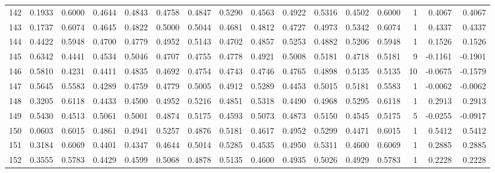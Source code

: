 \begin{tabular}{lrrrrrrrrrrrrrrr}
142 &      0.1933 &  0.6000 &  0.4644 &  0.4843 &  0.4758 &  0.4847 &  0.5290 &  0.4563 &  0.4922 &  0.5316 &   0.4502 &     0.6000 &      1 &                    0.4067 &                     0.4067 \\
143 &      0.1737 &  0.6074 &  0.4645 &  0.4822 &  0.5000 &  0.5044 &  0.4681 &  0.4812 &  0.4727 &  0.4973 &   0.5342 &     0.6074 &      1 &                    0.4337 &                     0.4337 \\
144 &      0.4422 &  0.5948 &  0.4700 &  0.4779 &  0.4952 &  0.5143 &  0.4702 &  0.4857 &  0.5253 &  0.4882 &   0.5206 &     0.5948 &      1 &                    0.1526 &                     0.1526 \\
145 &      0.6342 &  0.4441 &  0.4534 &  0.5046 &  0.4707 &  0.4755 &  0.4778 &  0.4921 &  0.5008 &  0.5181 &   0.4718 &     0.5181 &      9 &                   -0.1161 &                    -0.1901 \\
146 &      0.5810 &  0.4231 &  0.4411 &  0.4835 &  0.4692 &  0.4754 &  0.4743 &  0.4746 &  0.4765 &  0.4898 &   0.5135 &     0.5135 &     10 &                   -0.0675 &                    -0.1579 \\
147 &      0.5645 &  0.5583 &  0.4289 &  0.4759 &  0.4779 &  0.5005 &  0.4912 &  0.5289 &  0.4453 &  0.5015 &   0.5181 &     0.5583 &      1 &                   -0.0062 &                    -0.0062 \\
148 &      0.3205 &  0.6118 &  0.4433 &  0.4500 &  0.4952 &  0.5216 &  0.4851 &  0.5318 &  0.4490 &  0.4968 &   0.5295 &     0.6118 &      1 &                    0.2913 &                     0.2913 \\
149 &      0.5430 &  0.4513 &  0.5061 &  0.5001 &  0.4874 &  0.5175 &  0.4593 &  0.5073 &  0.4873 &  0.5150 &   0.4545 &     0.5175 &      5 &                   -0.0255 &                    -0.0917 \\
150 &      0.0603 &  0.6015 &  0.4861 &  0.4941 &  0.5257 &  0.4876 &  0.5181 &  0.4617 &  0.4952 &  0.5299 &   0.4471 &     0.6015 &      1 &                    0.5412 &                     0.5412 \\
151 &      0.3184 &  0.6069 &  0.4401 &  0.4347 &  0.4644 &  0.5014 &  0.5285 &  0.4535 &  0.4950 &  0.5311 &   0.4600 &     0.6069 &      1 &                    0.2885 &                     0.2885 \\
152 &      0.3555 &  0.5783 &  0.4429 &  0.4599 &  0.5068 &  0.4878 &  0.5135 &  0.4600 &  0.4935 &  0.5026 &   0.4929 &     0.5783 &      1 &                    0.2228 &                     0.2228 \\

\end{tabular}
